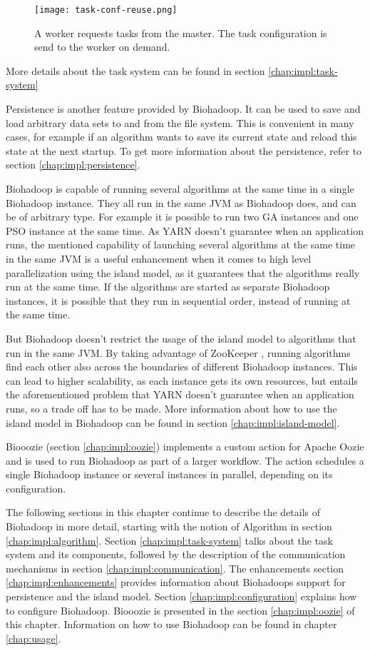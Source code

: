 \begin{figure}[ht!]
  \centering
  \texttt{[image: task-conf-reuse.png]}
  \caption{A worker requests tasks from the master. The task configuration is send to the worker on demand.}
  \label{fig:task-conf-reuse}
\end{figure}

More details about the task system can be found in section \ref{chap:impl:task-system}

Persistence is another feature provided by Biohadoop. It can be used to save and load arbitrary data sets to and from the file system. This is convenient in many cases, for example if an algorithm wants to save its current state and reload this state at the next startup. To get more information about the persistence, refer to section \ref{chap:impl:persistence}.

Biohadoop is capable of running several algorithms at the same time in a single Biohadoop instance. They all run in the same JVM as Biohadoop does, and can be of arbitrary type. For example it is possible to run two GA instances and one PSO instance at the same time. As YARN doesn't guarantee when an application runs, the mentioned capability of launching several algorithms at the same time in the same JVM is a useful enhancement when it comes to high level parallelization using the island model, as it guarantees that the algorithms really run at the same time. If the algorithms are started as separate Biohadoop instances, it is possible that they run in sequential order, instead of running at the same time.

But Biohadoop doesn't restrict the usage of the island model to algorithms that run in the same JVM. By taking advantage of ZooKeeper \cite{zookeeper}, running algorithms find each other also across the boundaries of different Biohadoop instances. This can lead to higher scalability, as each instance gets its own resources, but entails the aforementioned problem that YARN doesn't guarantee when an application runs, so a trade off has to be made. More information about how to use the island model in Biohadoop can be found in section \ref{chap:impl:island-model}.

Biooozie (section \ref{chap:impl:oozie}) implements a custom action for Apache Oozie and is used to run Biohadoop as part of a larger workflow. The action schedules a single Biohadoop instance or several instances in parallel, depending on its configuration.

The following sections in this chapter continue to describe the details of Biohadoop in more detail, starting with the notion of Algorithm in section \ref{chap:impl:algorithm}. Section \ref{chap:impl:task-system} talks about the task system and its components, followed by the description of the communication mechanisms in section \ref{chap:impl:communication}. The enhancements section \ref{chap:impl:enhancements} provides information about Biohadoops support for persistence and the island model. Section \ref{chap:impl:configuration} explains how to configure Biohadoop. Biooozie is presented in the section \ref{chap:impl:oozie} of this chapter. Information on how to use Biohadoop can be found in chapter \ref{chap:usage}.

